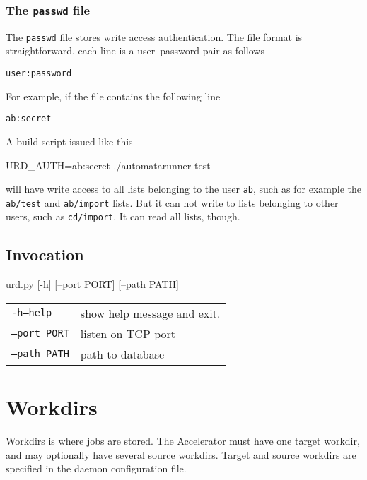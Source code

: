 \subsubsection{The \texttt{passwd} file}
The \texttt{passwd} file stores write access authentication.  The file
format is straightforward, each line is a user--password pair as follows
\begin{verbatim}
user:password
\end{verbatim}
For example, if the file contains the following line
\begin{verbatim}
ab:secret
\end{verbatim}
A build script issued like this
\begin{shell}
URD_AUTH=ab:secret ./automatarunner test
\end{shell}
will have write access to all lists belonging to the user \texttt{ab},
such as for example the \texttt{ab/test} and \texttt{ab/import} lists.
But it can not write to lists belonging to other users, such
as \texttt{cd/import}.  It can read all lists, though.


\subsection{Invocation}
\begin{shell}
urd.py [-h] [--port PORT] [--path PATH]
\end{shell}

\begin{snugshade}
\begin{tabular}{p{4cm}p{9cm}}
  \texttt{-h}\hspace{3cm}\texttt{---help} & show help message and
  exit.\\[4ex]

  \texttt{---port PORT} & listen on TCP port\\[4ex]

  \texttt{---path PATH} & path to database\\[4ex]
\end{tabular}
\end{snugshade}



\clearpage

\section{Workdirs}
Workdirs is where jobs are stored.  The Accelerator must have one
target workdir, and may optionally have several source workdirs.
Target and source workdirs are specified in the daemon configuration
file.


